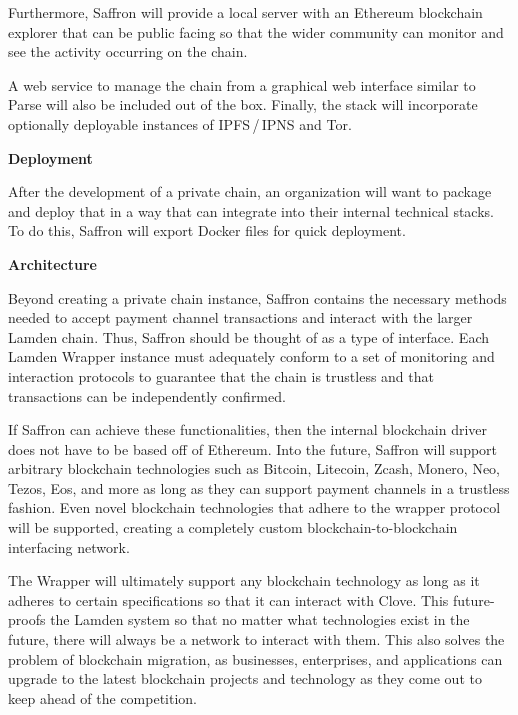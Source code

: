 \documentclass{%
	article}
\begin{document}
Furthermore, Saffron will provide a local server with an Ethereum blockchain explorer that can be public facing so that the wider community can monitor and see the activity occurring on the chain.

A web service to manage the chain from a graphical web interface similar to Parse will also be included out of the box. Finally, the stack will incorporate optionally deployable instances of IPFS\,/\,IPNS and Tor.

\begin{center}
\textbf{Deployment}
\end{center}

After the development of a private chain, an organization will want to package and deploy that in a way that can integrate into their internal technical stacks. To do this, Saffron will export Docker files for quick deployment.

\begin{center}
\textbf{Architecture}
\end{center}

Beyond creating a private chain instance, Saffron contains the necessary methods needed to accept payment channel transactions and interact with the larger Lamden chain. Thus, Saffron should be thought of as a type of interface. Each Lamden Wrapper instance must adequately conform to a set of monitoring and interaction protocols to guarantee that the chain is trustless and that transactions can be independently confirmed.

If Saffron can achieve these functionalities, then the internal blockchain driver does not have to be based off of Ethereum. Into the future, Saffron will support arbitrary blockchain technologies such as Bitcoin, Litecoin, Zcash, Monero, Neo, Tezos, Eos, and more as long as they can support payment channels in a trustless fashion. Even novel blockchain technologies that adhere to the wrapper protocol will be supported, creating a completely custom blockchain-to-blockchain interfacing network.

The Wrapper will ultimately support any blockchain technology as long as it adheres to certain specifications so that it can interact with Clove. This future-proofs the Lamden system so that no matter what technologies exist in the future, there will always be a network to interact with them. This also solves the problem of blockchain migration, as businesses, enterprises, and applications can upgrade to the latest blockchain projects and technology as they come out to keep ahead of the competition.
\end{document}

